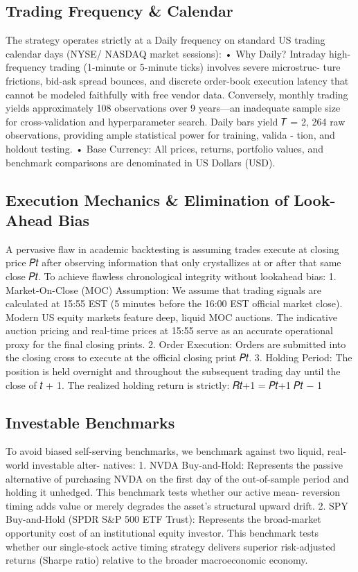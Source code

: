 \documentclass[12pt, a4paper]{article}
\begin{document}
\subsection{Trading Frequency \& Calendar}
The strategy operates strictly at a Daily frequency  on standard US trading calendar days (NYSE/
NASDAQ market sessions):
• Why Daily? Intraday high-frequency trading (1-minute or 5-minute ticks) involves severe microstruc-
ture frictions, bid-ask spread bounces, and discrete order-book execution latency that cannot be 
modeled faithfully with free vendor data. Conversely, monthly trading yields approximately 108 
observations over 9 years—an inadequate sample size for cross-validation and hyperparameter search. 
Daily bars yield 𝑇 = 2, 264 raw observations, providing ample statistical power for training, valida -
tion, and holdout testing.
• Base Currency: All prices, returns, portfolio values, and benchmark comparisons are denominated in 
US Dollars (USD).

\subsection{Execution Mechanics \& Elimination of Look-Ahead Bias}
A pervasive flaw in academic backtesting is assuming trades execute at closing price 𝑃𝑡 after observing 
information that only crystallizes at or after that same close 𝑃𝑡. To achieve flawless chronological 
integrity without lookahead bias:
1. Market-On-Close (MOC) Assumption: We assume that trading signals are calculated at 15:55 EST 
(5 minutes before the 16:00 EST official market close). Modern US equity markets feature deep, 
liquid MOC auctions. The indicative auction pricing and real-time prices at 15:55 serve as an accurate 
operational proxy for the final closing prints.
2. Order Execution: Orders are submitted into the closing cross to execute at the official closing print 
𝑃𝑡.
3. Holding Period: The position is held overnight and throughout the subsequent trading day until the 
close of 𝑡 + 1. The realized holding return is strictly:
𝑅{𝑡+1} =
𝑃{𝑡+1}
𝑃𝑡
− 1

\subsection{Investable Benchmarks}
To avoid biased self-serving benchmarks, we benchmark against two liquid, real-world investable alter-
natives:
1. NVDA Buy-and-Hold: Represents the passive alternative of purchasing NVDA on the first day of 
the out-of-sample period and holding it unhedged. This benchmark tests whether our active mean-
reversion timing adds value or merely degrades the asset's structural upward drift.
2. SPY Buy-and-Hold (SPDR S\&P 500 ETF Trust): Represents the broad-market opportunity cost of 
an institutional equity investor. This benchmark tests whether our single-stock active timing strategy 
delivers superior risk-adjusted returns (Sharpe ratio) relative to the broader macroeconomic economy.
\end{document}

